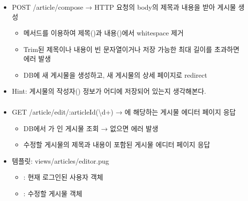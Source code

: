 \subsubsection*{}
\begin{itemize}
    \item POST /article/compose → HTTP 요청의 body의 제목과 내용을 받아 게시물 생성
    \begin{itemize}
        \item {} 메서드를 이용하여 제목()과 내용()에서 whitespace 제거
        \item Trim된 제목이나 내용이 빈 문자열이거나 저장 가능한 최대 길이를 초과하면  에러 발생
        \item DB에 새 게시물을 생성하고, 새 게시물의 상세 페이지로 redirect
    \end{itemize}
    \item Hint: 게시물의 작성자() 정보가 어디에 저장되어 있는지 생각해본다.
\end{itemize}

\subsubsection*{}
\begin{itemize}
    \item GET /article/edit/:articleId(\textbackslash{}d+) → 에 해당하는 게시물 에디터 페이지 응답
    \begin{itemize}
        \item DB에서 가 인 게시물 조회 → 없으면  에러 발생
        \item 수정할 게시물의 제목과 내용이 포함된 게시물 에디터 페이지 응답
    \end{itemize}
    \item 템플릿: views/articles/editor.pug
    \begin{itemize}
        \item {}: 현재 로그인된 사용자 객체
        \item {}: 수정할 게시물 객체
    \end{itemize}
\end{itemize}

